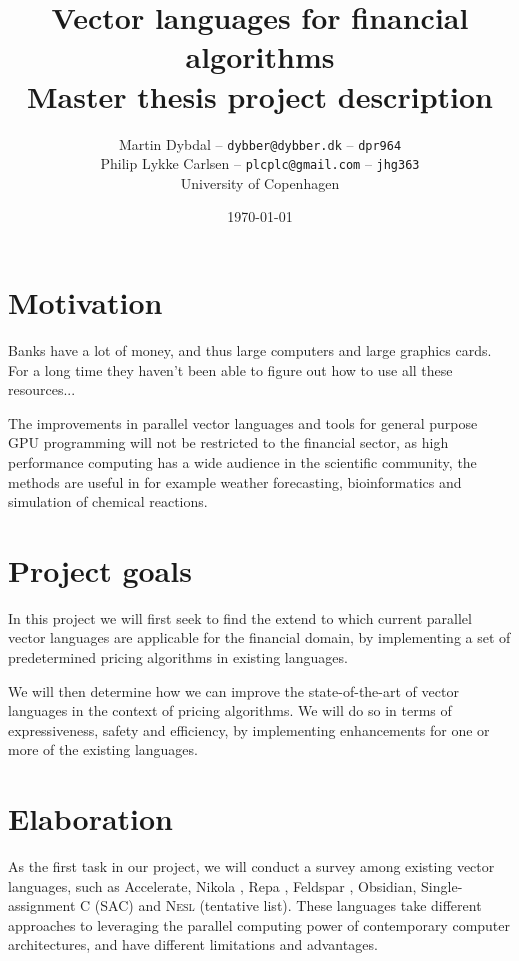 \documentclass[10pt,a4paper,final,oneside,openany,article]{memoir}
\title{Vector languages for financial algorithms \\
      \small{Master thesis project description}
}
\author{
  Martin Dybdal -- \texttt{dybber@dybber.dk} -- \texttt{dpr964} \\
  Philip Lykke Carlsen -- \texttt{plcplc@gmail.com} -- \texttt{jhg363}
\\
University of Copenhagen}
\date{\today}
\begin{document}
\maketitle

\chapter{Motivation}

Banks have a lot of money, and thus large computers and large graphics
cards. For a long time they haven't been able to figure out how to use
all these resources...


The improvements in parallel vector languages and tools for general
purpose GPU programming will not be restricted to the financial
sector, as high performance computing has a wide audience in the
scientific community, the methods are useful in for example weather
forecasting, bioinformatics and simulation of chemical
reactions.


\chapter{Project goals}
In this project we will first seek to find the extend to which
current parallel vector languages are applicable for the financial
domain, by implementing a set of predetermined pricing algorithms in
existing languages.

We will then determine how we can improve the state-of-the-art of
vector languages in the context of pricing algorithms. We will do so
in terms of expressiveness, safety and efficiency, by implementing
enhancements for one or more of the existing languages.

\chapter{Elaboration}


As the first task in our project, we will conduct a survey among
existing vector languages, such as
Accelerate\cite{chakravarty2011accelerating}, Nikola
\cite{mainland2010nikola}, Repa \cite{keller2010regular}, Feldspar
\cite{axelsson2010feldspar}, Obsidian, Single-assignment C (SAC) and
\textsc{Nesl} (tentative list). These languages take different
approaches to leveraging the parallel computing power of contemporary
computer architectures, and have different limitations and advantages.
\end{document}
